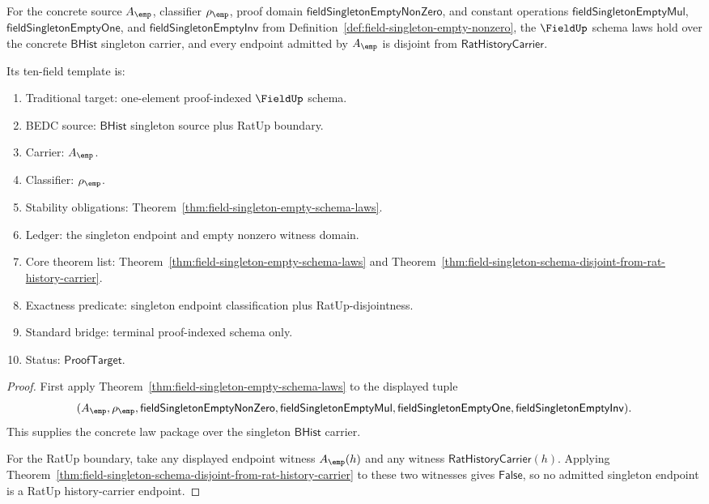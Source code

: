 \begin{theorem}
\label{thm:field-singleton-empty-concrete-instance-rat-disjoint}
For the concrete source $A_{\emp}$, classifier $\rho_{\emp}$, proof domain
$\mathsf{fieldSingletonEmptyNonZero}$, and constant operations
$\mathsf{fieldSingletonEmptyMul}$, $\mathsf{fieldSingletonEmptyOne}$, and
$\mathsf{fieldSingletonEmptyInv}$ from
Definition~\ref{def:field-singleton-empty-nonzero}, the $\FieldUp$ schema laws
hold over the concrete $\mathsf{BHist}$ singleton carrier, and every endpoint
admitted by $A_{\emp}$ is disjoint from $\mathsf{RatHistoryCarrier}$.

Its ten-field template is:
\begin{enumerate}
  \item Traditional target: one-element proof-indexed $\FieldUp$ schema.
  \item BEDC source: $\mathsf{BHist}$ singleton source plus RatUp boundary.
  \item Carrier: $A_{\emp}$.
  \item Classifier: $\rho_{\emp}$.
  \item Stability obligations:
  Theorem~\ref{thm:field-singleton-empty-schema-laws}.
  \item Ledger: the singleton endpoint and empty nonzero witness domain.
  \item Core theorem list:
  Theorem~\ref{thm:field-singleton-empty-schema-laws} and
  Theorem~\ref{thm:field-singleton-schema-disjoint-from-rat-history-carrier}.
  \item Exactness predicate: singleton endpoint classification plus
  RatUp-disjointness.
  \item Standard bridge: terminal proof-indexed schema only.
  \item Status: $\mathsf{ProofTarget}$.
\end{enumerate}
\end{theorem}
\begin{proof}
First apply Theorem~\ref{thm:field-singleton-empty-schema-laws} to the displayed
tuple
$$
(A_{\emp},\rho_{\emp},\mathsf{fieldSingletonEmptyNonZero},
\mathsf{fieldSingletonEmptyMul},\mathsf{fieldSingletonEmptyOne},
\mathsf{fieldSingletonEmptyInv}).
$$
This supplies the concrete law package over the singleton $\mathsf{BHist}$
carrier.

For the RatUp boundary, take any displayed endpoint witness $A_{\emp}(h)$ and
any witness $\mathsf{RatHistoryCarrier}(h)$. Applying
Theorem~\ref{thm:field-singleton-schema-disjoint-from-rat-history-carrier} to
these two witnesses gives $\mathsf{False}$, so no admitted singleton endpoint is
a RatUp history-carrier endpoint.
\end{proof}

